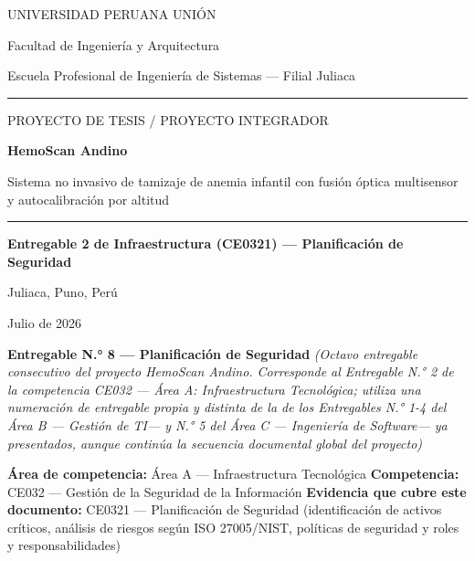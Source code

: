 \documentclass[11pt,a4paper]{article}
\begin{document}
\begin{titlepage}
\centering
\vspace*{1.2cm}
{\large UNIVERSIDAD PERUANA UNI\'ON\par}
{\normalsize Facultad de Ingenier\'ia y Arquitectura\par}
{\normalsize Escuela Profesional de Ingenier\'ia de Sistemas --- Filial Juliaca\par}
\vspace{0.5cm}
\rule{0.6\linewidth}{0.4pt}
\vspace{1.6cm}

{\large PROYECTO DE TESIS / PROYECTO INTEGRADOR\par}
\vspace{1.0cm}
{\huge\bfseries HemoScan Andino\par}
\vspace{0.6cm}
{\Large Sistema no invasivo de tamizaje de anemia infantil con fusi\'on \'optica multisensor y autocalibraci\'on por altitud\par}
\vspace{1.6cm}
\rule{0.6\linewidth}{0.4pt}
\vspace{1.6cm}

{\Large\bfseries Entregable 2 de Infraestructura (CE0321) --- Planificaci\'on de Seguridad\par}
\vspace{2.0cm}

{\normalsize Juliaca, Puno, Per\'u \par}
{\normalsize Julio de 2026\par}

\vfill
\end{titlepage}

\tableofcontents
\newpage

\textbf{Entregable N.° 8 --- Planificación de Seguridad}
\emph{(Octavo entregable consecutivo del proyecto HemoScan Andino. Corresponde al Entregable N.° 2 de la competencia CE032 --- Área A: Infraestructura Tecnológica; utiliza una numeración de entregable propia y distinta de la de los Entregables N.° 1-4 del Área B --- Gestión de TI--- y N.° 5 del Área C --- Ingeniería de Software--- ya presentados, aunque continúa la secuencia documental global del proyecto)}

\textbf{Área de competencia:} Área A --- Infraestructura Tecnológica
\textbf{Competencia:} CE032 --- Gestión de la Seguridad de la Información
\textbf{Evidencia que cubre este documento:} CE0321 --- Planificación de Seguridad (identificación de activos críticos, análisis de riesgos según ISO 27005/NIST, políticas de seguridad y roles y responsabilidades)
\end{document}
